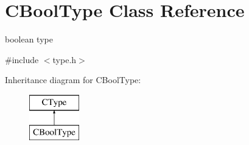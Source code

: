 \hypertarget{classCBoolType}{\section{C\-Bool\-Type Class Reference}
\label{classCBoolType}
}


boolean type  




{\ttfamily \#include $<$type.\-h$>$}

Inheritance diagram for C\-Bool\-Type\-:\begin{figure}[H]
\begin{center}
\leavevmode
\includegraphics[height=2.000000cm]{classCBoolType}
\end{center}
\end{figure}
